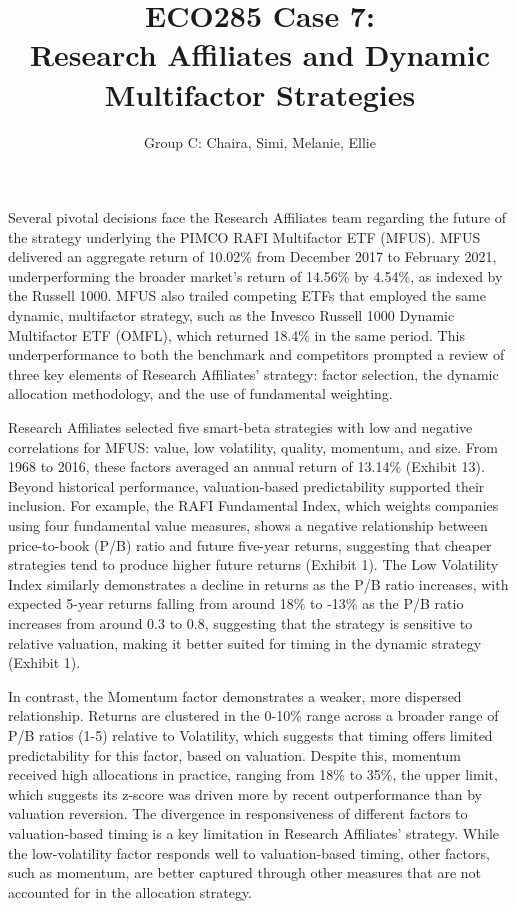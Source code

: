 \documentclass[
  letterpaper,
  DIV=11,
  numbers=noendperiod]{scrartcl}
\title{ECO285 Case 7:\\
Research Affiliates and Dynamic Multifactor Strategies}
\author{Group C: Chaira, Simi, Melanie, Ellie}
\date{}
\begin{document}
\maketitle

Several pivotal decisions face the Research Affiliates team regarding
the future of the strategy underlying the PIMCO RAFI Multifactor ETF
(MFUS). MFUS delivered an aggregate return of 10.02\% from December 2017
to February 2021, underperforming the broader market's return of 14.56\%
by 4.54\%, as indexed by the Russell 1000. MFUS also trailed competing
ETFs that employed the same dynamic, multifactor strategy, such as the
Invesco Russell 1000 Dynamic Multifactor ETF (OMFL), which returned
18.4\% in the same period. This underperformance to both the benchmark
and competitors prompted a review of three key elements of Research
Affiliates' strategy: factor selection, the dynamic allocation
methodology, and the use of fundamental weighting.

Research Affiliates selected five smart-beta strategies with low and
negative correlations for MFUS: value, low volatility, quality,
momentum, and size. From 1968 to 2016, these factors averaged an annual
return of 13.14\% (Exhibit 13). Beyond historical performance,
valuation-based predictability supported their inclusion. For example,
the RAFI Fundamental Index, which weights companies using four
fundamental value measures, shows a negative relationship between
price-to-book (P/B) ratio and future five-year returns, suggesting that
cheaper strategies tend to produce higher future returns (Exhibit 1).
The Low Volatility Index similarly demonstrates a decline in returns as
the P/B ratio increases, with expected 5-year returns falling from
around 18\% to -13\% as the P/B ratio increases from around 0.3 to 0.8,
suggesting that the strategy is sensitive to relative valuation, making
it better suited for timing in the dynamic strategy (Exhibit 1).

In contrast, the Momentum factor demonstrates a weaker, more dispersed
relationship. Returns are clustered in the 0-10\% range across a broader
range of P/B ratios (1-5) relative to Volatility, which suggests that
timing offers limited predictability for this factor, based on
valuation. Despite this, momentum received high allocations in practice,
ranging from 18\% to 35\%, the upper limit, which suggests its z-score
was driven more by recent outperformance than by valuation reversion.
The divergence in responsiveness of different factors to valuation-based
timing is a key limitation in Research Affiliates' strategy. While the
low-volatility factor responds well to valuation-based timing, other
factors, such as momentum, are better captured through other measures
that are not accounted for in the allocation strategy.
\end{document}

